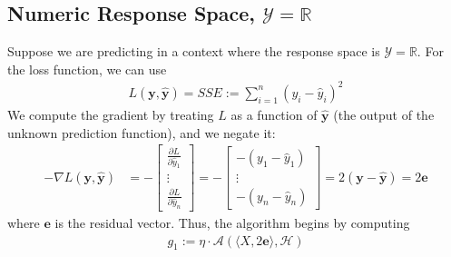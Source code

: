 \documentclass[12pt, a4paper]{article}
\theoremstyle{definition}
\begin{document}
	\subsection*{Numeric Response Space, $\mathcal{Y} = \mathbb{R}$}
	Suppose we are predicting in a context where the response space is
	$\mathcal{Y} = \mathbb{R}$. For the loss function, we can use
	\begin{align*}
		L(\bm{y}, \hat{\bm{y}}) = SSE := \sum_{i=1}^{n}(y_i - \hat{y}_i)^2
	\end{align*}
	We compute the gradient by treating $L$ as a function of $\hat{\bm{y}}$
	(the output of the unknown prediction function), and we negate it:
	\begin{align*}
		-\nabla L(\bm{y}, \hat{\bm{y}})
		&=
		-\begin{bmatrix}
			\frac{\partial L}{\partial \hat{y}_1}\\
			\vdots\\
			\frac{\partial L}{\partial \hat{y}_n}
		\end{bmatrix}
		=-\begin{bmatrix}
			-(y_1 - \hat{y}_1)\\
			\vdots\\
			-(y_n - \hat{y}_n)
		\end{bmatrix}
		=2(\bm{y}-\hat{\bm{y}})
		=2\bm{e}
	\end{align*}
	where $\bm{e}$ is the residual vector. Thus, the algorithm begins by computing
	\begin{align*}
		g_1 := \eta \cdot \mathcal{A}(\langle X, 2\bm{e}\rangle, \mathcal{H})
	\end{align*}
\end{document}
